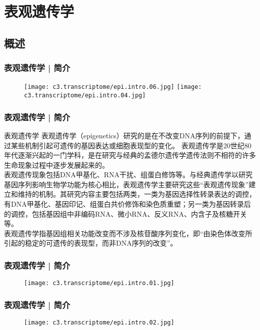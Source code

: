 \section{表观遗传学}
\subsection{概述}
\begin{frame}
  \frametitle{表观遗传学 | 简介}
  \begin{figure}
    \centering
    \texttt{[image: c3.transcriptome/epi.intro.06.jpg]}
    \texttt{[image: c3.transcriptome/epi.intro.04.jpg]}
  \end{figure}
\end{frame}

\begin{frame}
  \frametitle{表观遗传学 | 简介}
  \begin{block}{表观遗传学}
表观遗传学（epigenetics）研究的是在不改变DNA序列的前提下，通过某些机制引起可遗传的基因表达或细胞表现型的变化。 表观遗传学是20世纪80年代逐渐兴起的一门学科，是在研究与经典的孟德尔遗传学遗传法则不相符的许多生命现象过程中逐步发展起来的。\\
\vspace{1em}
表观遗传现象包括DNA甲基化、RNA干扰、组蛋白修饰等。与经典遗传学以研究基因序列影响生物学功能为核心相比，表观遗传学主要研究这些“表观遗传现象”建立和维持的机制。其研究内容主要包括两类，一类为基因选择性转录表达的调控，有DNA甲基化、基因印记、组蛋白共价修饰和染色质重塑；另一类为基因转录后的调控，包括基因组中非编码RNA、微小RNA、反义RNA、内含子及核糖开关等。\\
\vspace{1em}
表观遗传学指基因组相关功能改变而不涉及核苷酸序列变化，即“由染色体改变所引起的稳定的可遗传的表现型，而非DNA序列的改变”。
  \end{block}
\end{frame}

\begin{frame}
  \frametitle{表观遗传学 | 简介}
  \begin{figure}
    \centering
    \texttt{[image: c3.transcriptome/epi.intro.01.jpg]}
  \end{figure}
\end{frame}

\begin{frame}
  \frametitle{表观遗传学 | 简介}
  \begin{figure}
    \centering
    \texttt{[image: c3.transcriptome/epi.intro.02.jpg]}
  \end{figure}
\end{frame}

